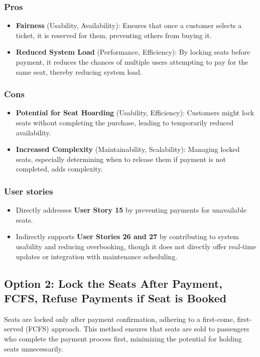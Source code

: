 \subsubsection*{Pros}
\begin{itemize}[noitemsep]
    \item \textbf{Fairness} (Usability, Availability): Ensures that once a customer selects a ticket, it is reserved for them, preventing others from buying it.
    \item \textbf{Reduced System Load} (Performance, Efficiency): By locking seats before payment, it reduces the chances of multiple users attempting to pay for the same seat, thereby reducing system load.
\end{itemize}
\subsubsection*{Cons}
\begin{itemize}[noitemsep]
    \item \textbf{Potential for Seat Hoarding} (Usability, Efficiency): Customers might lock seats without completing the purchase, leading to temporarily reduced availability.
    \item \textbf{Increased Complexity} (Maintainability, Scalability): Managing locked seats, especially determining when to release them if payment is not completed, adds complexity.
\end{itemize}
\subsubsection*{User stories}
\begin{itemize}
    \item Directly addresses \textbf{User Story 15} by preventing payments for unavailable seats.
    \item Indirectly supports \textbf{User Stories 26 and 27} by contributing to system usability and reducing overbooking, though it does not directly offer real-time updates or integration with maintenance scheduling.
\end{itemize}

\subsection*{Option 2: Lock the Seats After Payment, FCFS, Refuse Payments if Seat is Booked}
Seats are locked only after payment confirmation, adhering to a first-come, first-served (FCFS) approach. This method ensures that seats are sold to passengers who complete the payment process first, minimizing the potential for holding seats unnecessarily.

